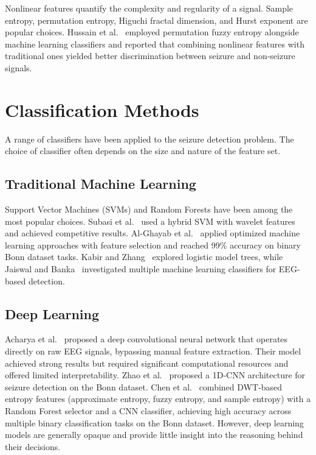 Nonlinear features quantify the complexity and regularity of a signal. Sample entropy, permutation entropy, Higuchi fractal dimension, and Hurst exponent are popular choices. Hussain et al.~\citep{hussain2019epileptic} employed permutation fuzzy entropy alongside machine learning classifiers and reported that combining nonlinear features with traditional ones yielded better discrimination between seizure and non-seizure signals.

\section{Classification Methods}

A range of classifiers have been applied to the seizure detection problem. The choice of classifier often depends on the size and nature of the feature set.

\subsection{Traditional Machine Learning}

Support Vector Machines (SVMs) and Random Forests have been among the most popular choices. Subasi et al.~\citep{subasi2019epileptic} used a hybrid SVM with wavelet features and achieved competitive results. Al-Ghayab et al.~\citep{alghayab2019epileptic} applied optimized machine learning approaches with feature selection and reached 99\% accuracy on binary Bonn dataset tasks. Kabir and Zhang~\citep{kabir2016optimum} explored logistic model trees, while Jaiswal and Banka~\citep{jaiswal2018epileptic} investigated multiple machine learning classifiers for EEG-based detection.

\subsection{Deep Learning}

Acharya et al.~\citep{acharya2018deep} proposed a deep convolutional neural network that operates directly on raw EEG signals, bypassing manual feature extraction. Their model achieved strong results but required significant computational resources and offered limited interpretability. Zhao et al.~\citep{zhao2020novel} proposed a 1D-CNN architecture for seizure detection on the Bonn dataset. Chen et al.~\citep{chen2023epileptic} combined DWT-based entropy features (approximate entropy, fuzzy entropy, and sample entropy) with a Random Forest selector and a CNN classifier, achieving high accuracy across multiple binary classification tasks on the Bonn dataset. However, deep learning models are generally opaque and provide little insight into the reasoning behind their decisions.

